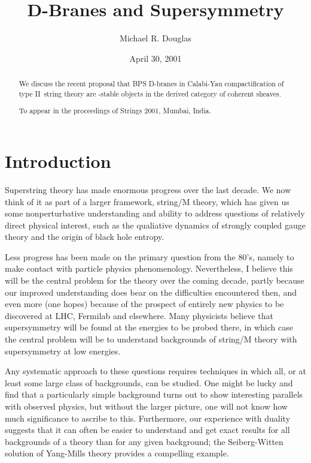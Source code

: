 \documentclass[a4paper,12pt]{amsart}
\numberwithin{equation}{section}
\theoremstyle{plain}
\theoremstyle{definition}
\def\cal{\mathcal}
\def \II {II}
\def\CN{{\cal N}}
\begin{document}
\title{D-Branes and \myHighlight{$\CN=1$}\coordHE{} Supersymmetry}

\author[M.R. Douglas]{Michael R. Douglas}
\address[Michael R. Douglas]{
Dept. of Physics and Astronomy, Rutgers University,
Piscataway, NJ 08855 USA {\it and}
I.H.E.S., Le Bois-Marie, Bures-sur-Yvette 91440 France}
\begin{abstract}
We discuss the recent proposal that BPS D-branes in Calabi-Yau
compactification of type \II\ string theory are \myHighlight{$\Pi$}\coordHE{}-stable
objects in the derived category of coherent sheaves.

To appear in the proceedings of Strings 2001, Mumbai, India.
\end{abstract}

\date{April 30, 2001}
\maketitle
\section{Introduction}\label{S:intro}
Superstring theory has made enormous progress over the last decade.
We now think of it as part of a larger framework, string/M theory,
which has given us some nonperturbative understanding and ability to
address questions of relatively direct physical interest, such as the
qualiative dynamics of strongly coupled gauge theory and the origin
of black hole entropy.

Less progress has been made on the primary question from the 80's,
namely to make contact with particle physics phenomenology.
Nevertheless, I believe this will be the central problem for the
theory over the coming decade, partly because our improved
understanding does bear on the difficulties encountered then, and even
more (one hopes) because of the prospect of entirely new physics to be
discovered at LHC, Fermilab and elsewhere.  Many physicists believe that
supersymmetry will be found at the energies to be probed there, in which
case the central problem will be to understand backgrounds of
string/M theory with \myHighlight{$\CN=1$}\coordHE{} supersymmetry at low energies.

Any systematic approach to these questions requires techniques in
which all, or at least some large class of backgrounds, can be
studied.  One might be lucky and find that a particularly simple
background turns out to show interesting parallels with observed
physics, but without the larger picture, one will not know how much
significance to ascribe to this.  Furthermore, our experience with
duality suggests that it can often be easier to understand and get
exact results for all backgrounds of a theory than for any given
background; the Seiberg-Witten solution of \myHighlight{$\CN=2$}\coordHE{} Yang-Mills theory
provides a compelling example.
\end{document}
